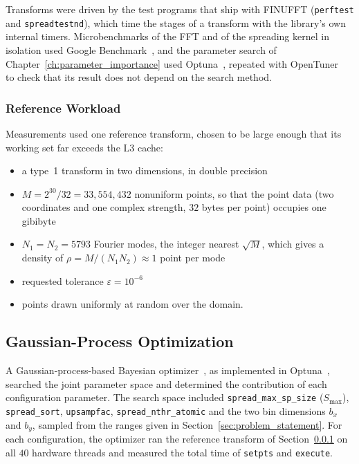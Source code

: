 Transforms were driven by the test programs that ship with FINUFFT (\texttt{perftest} and \texttt{spreadtestnd}), which time the stages of a transform with the library's own internal timers. Microbenchmarks of the FFT and of the spreading kernel in isolation used Google Benchmark~\cite{googlebenchmark}, and the parameter search of Chapter~\ref{ch:parameter_importance} used Optuna~\cite{optuna2019}, repeated with OpenTuner~\cite{ansel2014opentuner} to check that its result does not depend on the search method.

\subsubsection{Reference Workload}
\label{sec:workload}

Measurements used one reference transform, chosen to be large enough that its working set far exceeds the L3 cache:

\begin{itemize}
    \item a type~1 transform in two dimensions, in double precision
    \item $M = 2^{30}/32 = 33{,}554{,}432$ nonuniform points, so that the point data (two coordinates and one complex strength, $32$ bytes per point) occupies one gibibyte
    \item $N_1 = N_2 = 5793$ Fourier modes, the integer nearest $\sqrt{M}$, which gives a density of $\rho = M/(N_1 N_2) \approx 1$ point per mode
    \item requested tolerance $\varepsilon = 10^{-6}$
    \item points drawn uniformly at random over the domain.
\end{itemize}


\subsection{Gaussian-Process Optimization}

A Gaussian-process-based Bayesian optimizer~\cite{rasmussen2006,snoek2012}, as implemented in Optuna~\cite{optuna2019}, searched the joint parameter space and determined the contribution of each configuration parameter. The search space included \texttt{spread\_max\_sp\_size} ($S_{\max}$), \texttt{spread\_sort}, \texttt{upsampfac}, \texttt{spread\_nthr\_atomic} and the two bin dimensions $b_x$ and $b_y$, sampled from the ranges given in Section~\ref{sec:problem_statement}. For each configuration, the optimizer ran the reference transform of Section~\ref{sec:workload} on all $40$ hardware threads and measured the total time of \texttt{setpts} and \texttt{execute}.


